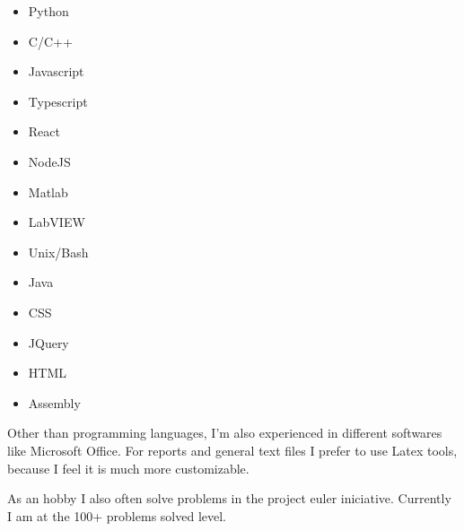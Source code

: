 \documentclass[]{friggeri-cv} %
\begin{document}
\setlength{\columnsep}{0cm}
\begin{multicols}{2}
	\begin{itemize} \itemsep0.5pt \parskip-1pt 
		\item Python
		\item C/C++
		\item Javascript
		\item Typescript
		\item React
		\item NodeJS
		\item Matlab
		\item LabVIEW
		\item Unix/Bash
		\item Java
		\item CSS
		\item JQuery
		\item HTML
		\item Assembly
	\end{itemize}
\end{multicols}


Other than programming languages, I'm also experienced in different softwares like Microsoft Office. For reports and general text files I prefer to use Latex tools, because I feel it is much more customizable.

As an hobby I also often solve problems in the project euler iniciative. Currently I am at the 100+ problems solved level.








\end{document}
